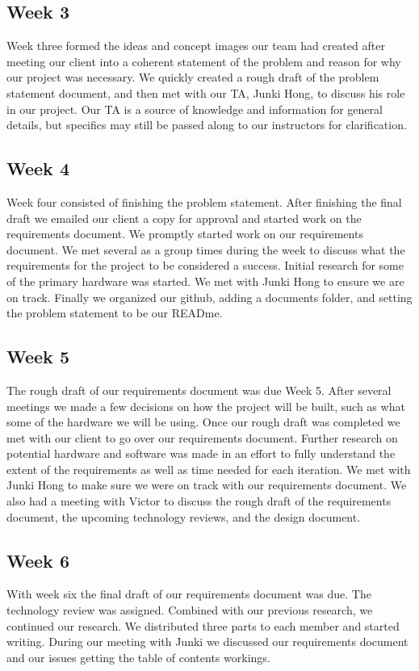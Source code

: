 \documentclass[onecolumn, draftclsnofoot,10pt, compsoc]{IEEEtran}
\begin{document}
		\subsection{Week 3}
		Week three formed the ideas and concept images our team had created after meeting our client into a coherent statement of the problem and reason for why our project was necessary.
		We quickly created a rough draft of the problem statement document, and then met with our TA, Junki Hong, to discuss his role in our project.
		Our TA is a source of knowledge and information for general details, but specifics may still be passed along to our instructors for clarification.

		\subsection{Week 4}
		Week four consisted of finishing the problem statement. After finishing the final draft we emailed our client a copy for approval and started work on the requirements document.
		We promptly started work on our requirements document. We met several as a group times during the week to discuss what the requirements for the project  to be considered a success.
		Initial research for some of the primary hardware was started. We met with Junki Hong to ensure we are on track.
		Finally we organized our github, adding a documents folder, and setting the problem statement to be our READme.

		\subsection{Week 5}
		The rough draft of our requirements document was due Week 5. After several meetings we made a few decisions on how the project will be built, such as what some of the hardware we will be using.
		Once our rough draft was completed we met with our client to go over our requirements document.
		Further research on potential hardware and software was made in an effort to fully understand the extent of the requirements as well as time needed for each iteration.
		We met with Junki Hong to make sure we were on track with our requirements document.  We also had a meeting with Victor to discuss the rough draft of the requirements document, the upcoming technology
		reviews, and the design document.

		\subsection{Week 6}
		With week six the final draft of our requirements document was due. The technology review was assigned.
		Combined with our previous research, we continued our research. We distributed three parts to each member and started writing.
		During our meeting with Junki we discussed our requirements document and our issues getting the table of contents workings.
\end{document}
